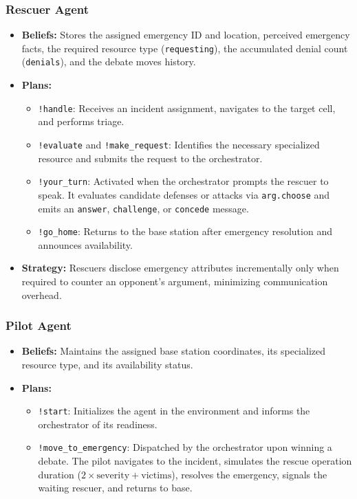 \subsubsection{Rescuer Agent}
\begin{itemize}
    \item \textbf{Beliefs:} Stores the assigned emergency ID and location, perceived emergency facts, the required resource type (\texttt{requesting}), the accumulated denial count (\texttt{denials}), and the debate moves history.
    \item \textbf{Plans:}
    \begin{itemize}
        \item \texttt{!handle}: Receives an incident assignment, navigates to the target cell, and performs triage.
        \item \texttt{!evaluate} and \texttt{!make\_request}: Identifies the necessary specialized resource and submits the request to the orchestrator.
        \item \texttt{!your\_turn}: Activated when the orchestrator prompts the rescuer to speak. It evaluates candidate defenses or attacks via \texttt{arg.choose} and emits an \texttt{answer}, \texttt{challenge}, or \texttt{concede} message.
        \item \texttt{!go\_home}: Returns to the base station after emergency resolution and announces availability.
    \end{itemize}
    \item \textbf{Strategy:} Rescuers disclose emergency attributes incrementally only when required to counter an opponent's argument, minimizing communication overhead.
\end{itemize}

\subsubsection{Pilot Agent}
\begin{itemize}
    \item \textbf{Beliefs:} Maintains the assigned base station coordinates, its specialized resource type, and its availability status.
    \item \textbf{Plans:}
    \begin{itemize}
        \item \texttt{!start}: Initializes the agent in the environment and informs the orchestrator of its readiness.
        \item \texttt{!move\_to\_emergency}: Dispatched by the orchestrator upon winning a debate. The pilot navigates to the incident, simulates the rescue operation duration ($2 \times \mathrm{severity} + \mathrm{victims}$), resolves the emergency, signals the waiting rescuer, and returns to base.
    \end{itemize}
\end{itemize}
